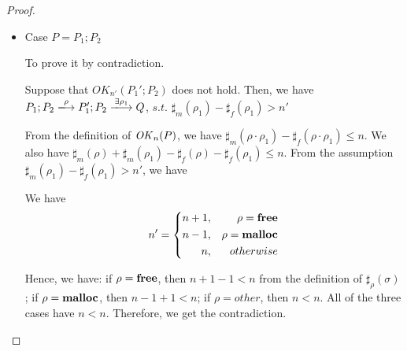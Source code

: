 \begin{proof}
\begin{itemize}
\item Case $P = P_{1};P_{2}$

To prove it by contradiction.

Suppose that \(OK_{n'}(P_{1}';P_{2})\) does not hold. Then, we have
\(P_{1};P_{2} \xlongrightarrow{\rho} P_{1}';P_{2}
\xlongrightarrow{\exists \rho_1} Q\), \(s.t.\) \(\sharp_{m}(\rho_1) -
\sharp_{f}(\rho_1) > n'\)

From the definition of \(\mathit{OK}_n(P)\), we have \( \sharp_{m}(\rho \cdot \rho_1) - \sharp_{f}(\rho \cdot \rho_1) \le n\).  We also have \(\sharp_{m}(\rho) + \sharp_{m}(\rho_1) - \sharp_{f}(\rho) -\sharp_{f}(\rho_1) \le n\).   From the assumption \(\sharp_{m}(\rho_1) - \sharp_{f}(\rho_1) > n'\), we have 

We have
$$
   n'=\left\{
   \begin{aligned}
     n + 1, && \rho = \mathbf{free} \\
     n - 1,  && \rho = \mathbf{malloc}  \\
     n ,      && otherwise
   \end{aligned}
   \right.
$$

Hence, we have: if \(\rho = \mathbf{free}\), then \(n + 1 - 1 < n\) from the definition of \(\sharp_{\rho}(\sigma)\); if \(\rho = \mathbf{malloc}\), then \( n - 1 + 1 < n \); if \( \rho = other\), then \( n < n \). All of the three cases have \(n < n\). Therefore, we get the contradiction.

\end{itemize}
\end{proof}

